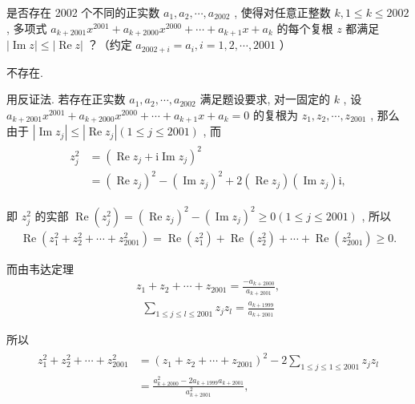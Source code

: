 \begin{example}
	是否存在 2002 个不同的正实数 $a_1, a_2, \cdots, a_{2002}$ , 使得对任意正整数 $k, 1 \leqslant k \leqslant 2002$, 多项式 $a_{k+2001} x^{2001}+a_{k+2000} x^{2000}+\cdots+a_{k+1} x+a_k$ 的每个复根 $z$ 都满足 $|\operatorname{Im} z| \leqslant|\operatorname{Re} z|$ ？（约定 $a_{2002+i}=a_i, i=1,2, \cdots, 2001$ ）
\end{example}
\begin{solution}
	不存在.

	用反证法. 若存在正实数 $a_1, a_2, \cdots, a_{2002}$ 满足题设要求, 对一固定的 $k$ , 设 $a_{k+2001} x^{2001}+a_{k+2000} x^{2000}+\cdots+a_{k+1} x+a_k=0$ 的复根为 $z_1, z_2, \cdots, z_{2001}$ , 那么由于 $\left|\operatorname{Im} z_j\right| \leqslant\left|\operatorname{Re} z_j\right|(1 \leqslant j \leqslant 2001)$ , 而
	\begin{align*}
		\begin{aligned}
			z_j^2 & =\left(\operatorname{Re} z_j+\mathrm{i} \operatorname{Im} z_j\right)^2                                                                                       \\
			      & =\left(\operatorname{Re} z_j\right)^2-\left(\operatorname{Im} z_j\right)^2+2\left(\operatorname{Re} z_j\right)\left(\operatorname{Im} z_j\right) \mathrm{i},
		\end{aligned}
	\end{align*}

	即 $z_j^2$ 的实部 $\operatorname{Re}\left(z_j^2\right)=\left(\operatorname{Re} z_j\right)^2-\left(\operatorname{Im} z_j\right)^2 \geqslant 0(1 \leqslant j \leqslant 2001)$ , 所以
	\begin{align*}
		\operatorname{Re}\left(z_1^2+z_2^2+\cdots+z_{2001}^2\right)=\operatorname{Re}\left(z_1^2\right)+\operatorname{Re}\left(z_2^2\right)+\cdots+\operatorname{Re}\left(z_{2001}^2\right) \geqslant 0 .
	\end{align*}

	而由韦达定理
	\begin{align*}
		z_1+z_2+\cdots+z_{2001}=\frac{-a_{k+2000}}{a_{k+2001}},
	\end{align*}
	\begin{align*}
		\sum_{1 \leqslant j \leqslant l \leqslant 2001} z_j z_l=\frac{a_{k+1999}}{a_{k+2001}}
	\end{align*}

	所以
	\begin{align*}
		\begin{aligned}
			z_1^2+z_2^2+\cdots+z_{2001}^2 & =\left(z_1+z_2+\cdots+z_{2001}\right)^2-2 \sum_{1 \leqslant j \leqslant 1 \leqslant 2001} z_j z_l \\
			                              & =\frac{a_{k+2000}^2-2 a_{k+1999} a_{k+2001}}{a_{k+2001}^2},
		\end{aligned}
	\end{align*}


\end{solution}
